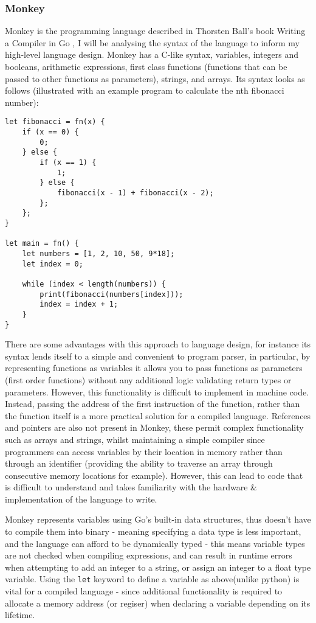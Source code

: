 \subsubsection{Monkey}
Monkey is the programming language described in Thorsten Ball's book Writing a Compiler in Go \textcite{Ball-WritingACompilerInGo}, I will be analysing the syntax of the language to inform my high-level language design. Monkey has a C-like syntax, variables, integers and booleans, arithmetic expressions, first class functions (functions that can be passed to other functions as parameters), strings, and arrays. Its syntax looks as follows (illustrated with an example program to calculate the nth fibonacci number):
\begin{lstlisting}
let fibonacci = fn(x) {
    if (x == 0) {
        0;
    } else {
        if (x == 1) {
            1;
        } else {
            fibonacci(x - 1) + fibonacci(x - 2);
        };
    };
}

let main = fn() {
    let numbers = [1, 2, 10, 50, 9*18];
    let index = 0;

    while (index < length(numbers)) {
        print(fibonacci(numbers[index]));
        index = index + 1;
    }
}
\end{lstlisting}

There are some advantages with this approach to language design, for instance its syntax lends itself to a simple and convenient to program parser, in particular, by representing functions as variables it allows you to pass functions as parameters (first order functions) without any additional logic validating return types or parameters. However, this functionality is difficult to implement in machine code. Instead, passing the address of the first instruction of the function, rather than the function itself is a more practical solution for a compiled language. References and pointers are also not present in Monkey, these permit complex functionality such as arrays and strings, whilst maintaining a simple compiler since programmers can access variables by their location in memory rather than through an identifier (providing the ability to traverse an array through consecutive memory locations for example). However, this can lead to code that is difficult to understand and takes familiarity with the hardware \& implementation of the language to write. 

Monkey represents variables using Go's built-in data structures, thus doesn't have to compile them into binary - meaning specifying a data type is less important, and the language can afford to be dynamically typed - this means variable types are not checked when compiling expressions, and can result in runtime errors when attempting to add an integer to a string, or assign an integer to a float type variable. Using the \texttt{let} keyword to define a variable as above(unlike python) is vital for a compiled language - since additional functionality is required to allocate a memory address (or regiser) when declaring a variable depending on its lifetime.

